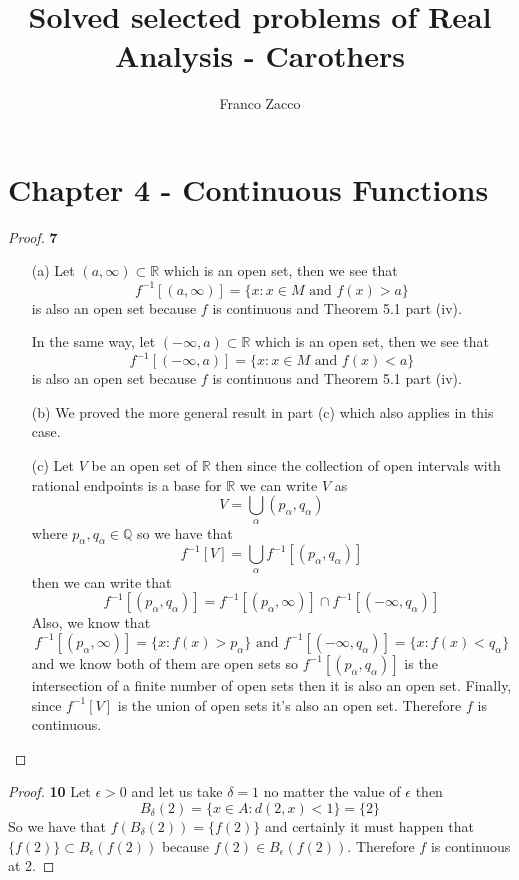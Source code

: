 \documentclass[11pt]{article}
\title{\textbf{Solved selected problems of Real Analysis - Carothers}}
\author{Franco Zacco}
\date{}
\newcommand{\Q}{\mathbb{Q}}
\newcommand{\R}{\mathbb{R}}
\theoremstyle{definition}
\begin{document}
\maketitle
\thispagestyle{empty}

\section*{Chapter 4 - Continuous Functions}

	\begin{proof}{\textbf{7}}
    \begin{itemize}
        \item [(a)] Let $(a, \infty) \subset \R$ which is an open set, then
        we see that
        $$f^{-1}[(a,\infty)] = \{x: x \in M \text{ and } f(x) > a\}$$
        is also an open set because $f$ is continuous and Theorem 5.1
        part (iv).

        In the same way, let $(-\infty, a) \subset \R$ which is an open set,
        then we see that
        $$f^{-1}[(-\infty,a)] = \{x: x \in M \text{ and } f(x) < a\}$$
        is also an open set because $f$ is continuous and Theorem 5.1
        part (iv).

        \item [(b)] We proved the more general result in part (c) which also
        applies in this case.

        \item [(c)] Let $V$ be an open set of $\R$ then since the collection of
        open intervals with rational endpoints is a base for $\R$ we can write
        $V$ as
        $$V = \bigcup_\alpha (p_\alpha, q_\alpha)$$
        where $p_\alpha, q_\alpha \in \Q$ so we have that
        $$f^{-1}[V] = \bigcup_\alpha f^{-1}[(p_\alpha, q_\alpha)]$$
        then we can write that
        $$f^{-1}[(p_\alpha, q_\alpha)] =
        f^{-1}[(p_\alpha, \infty)] \cap f^{-1}[(-\infty, q_\alpha)]$$
        Also, we know that
        $$f^{-1}[(p_\alpha, \infty)] = \{x: f(x) > p_\alpha\}
        \text{ and } f^{-1}[(-\infty, q_\alpha)] = \{x: f(x) < q_\alpha\}$$
         and we know
        both of them are open sets so $f^{-1}[(p_\alpha,q_\alpha)]$ is
        the intersection of a finite number of open sets then it is also an open
        set. Finally, since $f^{-1}[V]$ is the union of open sets it's also
        an open set. Therefore $f$ is continuous. 
    \end{itemize}
    \end{proof}
    \begin{proof}{\textbf{10}}
        Let $\epsilon > 0$ and let us take $\delta = 1$ no matter the value of
        $\epsilon$ then
        $$B_\delta(2) = \{x \in A: d(2,x) < 1\} = \{2\}$$
        So we have that $f(B_\delta(2)) = \{f(2)\}$ and certainly it must happen
        that $\{f(2)\} \subset B_\epsilon(f(2))$ because
        $f(2) \in B_\epsilon(f(2))$. Therefore $f$ is continuous at 2.
    \end{proof}
\end{document}
